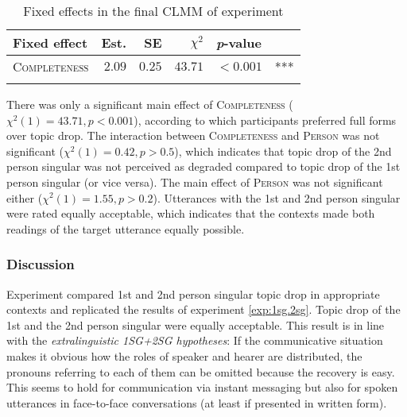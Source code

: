 \begin{table}
\caption{Fixed effects in the final CLMM of experiment }
\centering
\begin{tabular}{lrrrll}
\lsptoprule
Fixed effect & Est. & SE & $\chi^2$ & \textit{p}-value &   \\
\midrule
\textsc{Completeness} & $2.09$ & $0.25$ & $43.71$ & $< 0.001$ & ***\\
\lspbottomrule
\end{tabular}
\label{tab:1sg.2sg.model.spoken}
\end{table}

\noindent
There was only a significant main effect of \textsc{Completeness} ($\chi^2(1) = 43.71, p < 0.001$), according to which participants preferred full forms over topic drop.
The interaction between \textsc{Completeness} and \textsc{Person} was not significant ($\chi^2(1) = 0.42, p > 0.5$), which indicates that topic drop of the 2nd person singular was not perceived as degraded compared to topic drop of the 1st person singular (or vice versa).
The main effect of \textsc{Person} was not significant either ($\chi^2(1) = 1.55, p > 0.2$).
Utterances with the 1st and 2nd person singular were rated equally acceptable, which indicates that the contexts made both readings of the target utterance equally possible.

\subsubsection{Discussion}
Experiment  compared 1st and 2nd person singular topic drop in appropriate contexts and replicated the results of experiment \ref*{exp:1sg.2sg}.
Topic drop of the 1st and the 2nd person singular were equally acceptable.
This result is in line with the \textit{extralinguistic 1SG+2SG hypotheses}:
If the communicative situation makes it obvious how the roles of speaker and hearer are distributed, the pronouns referring to each of them can be omitted because the recovery  is easy.
This seems to hold for communication via instant messaging but also for spoken utterances in face-to-face conversations (at least if presented in written form).

